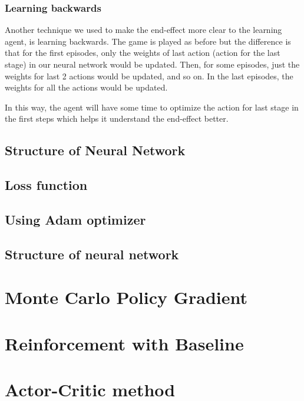 \documentclass[a4paper,12pt]{article}  %
\theoremstyle{definition}
\begin{document}
	\subsubsection{Learning backwards}
	Another technique we used to make the end-effect more clear to the learning agent, is learning backwards.
	The game is played as before but the difference is that for the first episodes, only the weights of last action (action for the last stage) in our neural network would be updated. Then, for some episodes, just the weights for last 2 actions would be updated, and so on. In the last episodes, the weights for all the actions would be updated.
	
	In this way, the agent will have some time to optimize the action for last stage in the first steps which helps it understand the end-effect better.
	
	
	\subsection{Structure of Neural Network}
	
	\subsection{Loss function}
	
	\subsection{Using Adam optimizer}
	
	
	\subsection{Structure of neural network}
	
	\section{Monte Carlo Policy Gradient}
	
	\section{Reinforcement with Baseline}
	
	\section{Actor-Critic method}
		
	

	
	\small
	
	 
	
\end{document}
